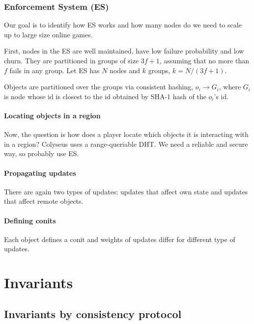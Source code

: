 \documentclass[twocolumn,10pt]{article}
\begin{document}
{\subsubsection{Enforcement System (ES)}
Our goal is to identify how ES works and how many nodes do we need to scale up to large size online games.

First, nodes in the ES are well maintained, have low failure probability and low churn. They are partitioned in groups of size $3f+1$, assuming that no more than $f$ fails in any group.
Let ES has $N$ nodes and $k$ groups, $k=N/(3f+1)$.

Objects are partitioned over the groups via consistent hashing, $o_i \rightarrow G_i$, where $G_i$ is node whose id is closest to the id obtained by SHA-1 hash of the $o_i$'s id.

\paragraph{Locating objects in a region} Now, the question is how does a player locate which objects it is interacting with in a region? Colyseus uses a range-queriable DHT. We need a reliable and secure way, so probably use ES. 

\paragraph{Propagating updates} There are again two types of updates: updates that affect own state and updates that affect remote objects. 

\paragraph{Defining conits} Each object defines a conit and weights of updates differ for different type of updates. 


\section{Invariants}



\subsection{Invariants by consistency protocol}


}
\end{document}
